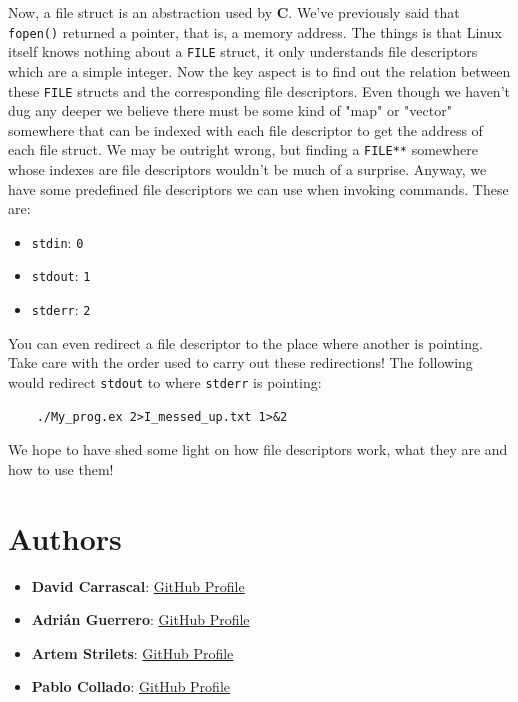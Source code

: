 \documentclass[12pt]{article}
\begin{document}
		Now, a file struct is an abstraction used by \textbf{C}. We've previously said that \texttt{fopen()} returned a pointer, that is, a memory address. The things is that Linux itself knows nothing about a \texttt{FILE} struct, it only understands file descriptors which are a simple integer. Now the key aspect is to find out the relation between these \texttt{FILE} structs and the corresponding file descriptors. Even though we haven't dug any deeper we believe there must be some kind of "map" or "vector" somewhere that can be indexed with each file descriptor to get the address of each file struct. We may be outright wrong, but finding a \texttt{FILE**} somewhere whose indexes are file descriptors wouldn't be much of a surprise. Anyway, we have some predefined file descriptors we can use when invoking commands. These are:

		\begin{itemize}
			\item \texttt{stdin}: \texttt{0}
			\item \texttt{stdout}: \texttt{1}
			\item \texttt{stderr}: \texttt{2}
		\end{itemize}

		You can even redirect a file descriptor to the place where another is pointing. Take care with the order used to carry out these redirections! The following would redirect \texttt{stdout} to where \texttt{stderr} is pointing:

		\begin{verbatim}
	./My_prog.ex 2>I_messed_up.txt 1>&2
		\end{verbatim}

		We hope to have shed some light on how file descriptors work, what they are and how to use them!

\section{Authors}

	\begin{itemize}
		\item \textbf{David Carrascal}: \href{https://github.com/davidcawork}{GitHub Profile}
		\item \textbf{Adrián Guerrero}: \href{https://github.com/adrihamel}{GitHub Profile}
		\item \textbf{Artem Strilets}: \href{https://github.com/pcolladosoto}{GitHub Profile}
		\item \textbf{Pablo Collado}: \href{https://github.com/ArtemSSOO}{GitHub Profile}
	\end{itemize}



{}
\end{document}
